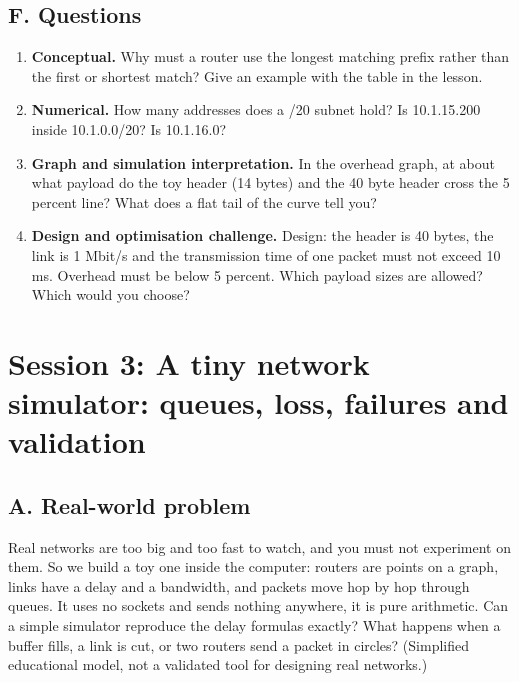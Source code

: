 \documentclass[11pt,a4paper]{article}
\begin{document}
\subsection*{F. Questions}
\begin{enumerate}[nosep]
\item \textbf{Conceptual.} Why must a router use the longest matching prefix rather than the first or shortest match? Give an example with the table in the lesson.
\item \textbf{Numerical.} How many addresses does a /20 subnet hold? Is 10.1.15.200 inside 10.1.0.0/20? Is 10.1.16.0?
\item \textbf{Graph and simulation interpretation.} In the overhead graph, at about what payload do the toy header (14 bytes) and the 40 byte header cross the 5 percent line? What does a flat tail of the curve tell you?
\item \textbf{Design and optimisation challenge.} Design: the header is 40 bytes, the link is 1 Mbit/s and the transmission time of one packet must not exceed 10 ms. Overhead must be below 5 percent. Which payload sizes are allowed? Which would you choose?
\end{enumerate}

\section{Session 3: A tiny network simulator: queues, loss, failures and validation}

\subsection*{A. Real-world problem}
Real networks are too big and too fast to watch, and you must not experiment on them. So we build a toy one inside the computer: routers are points on a graph, links have a delay and a bandwidth, and packets move hop by hop through queues. It uses no sockets and sends nothing anywhere, it is pure arithmetic. Can a simple simulator reproduce the delay formulas exactly? What happens when a buffer fills, a link is cut, or two routers send a packet in circles? (Simplified educational model, not a validated tool for designing real networks.)
\end{document}
